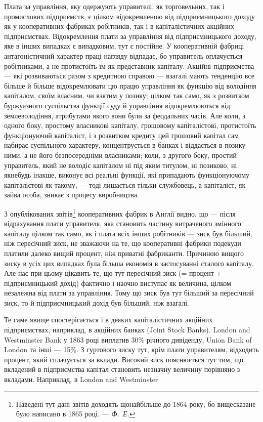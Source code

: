 
Плата за управління, яку одержують управителі, як торговельних,
так і промислових підприємств, є цілком відокремленою від
підприємницького доходу як у кооперативних фабриках робітників,
так і в капіталістичних акційних підприємствах. Відокремлення
плати за управління від підприємницького доходу, яке в інших
випадках є випадковим, тут є постійне. У кооперативній фабриці
антагоністичний характер праці нагляду відпадає, бо управитель
оплачується робітниками, а не протистоїть їм як представник
капіталу. Акційні підприємства — які розвиваються разом
з кредитною справою — взагалі мають тенденцію все більше й
більше відокремлювати цю працю управління як функцію від
володіння капіталом, своїм власним, чи взятим у позику; цілком
так само, як з розвитком буржуазного суспільства функції суду
й управління відокремлюються від землеволодіння, атрибутами
якого вони були за феодальних часів. Але коли, з одного
боку, простому власникові капіталу, грошовому капіталістові,
протистоїть функціонуючий капіталіст, і з розвитком кредиту
цей грошовий капітал сам набирає суспільного характеру, концентрується
в банках і віддається в позику ними, а не його безпосередніми
власниками; коли, з другого боку, простий
управитель, який не володіє капіталом ні під яким титулом,
ні позиково, ні якнебудь інакше, виконує всі реальні функції,
які припадають функціонуючому капіталістові як такому, — тоді
лишається тільки службовець, а капіталіст, як зайва особа,
зникає з процесу виробництва.

З опублікованих звітів\footnote{
Наведені тут дані звітів доходять щонайбільше до 1864 року, бо вищесказане
було написано в 1865 році. — \emph{Ф.~Е.}
} кооперативних фабрик в Англії видно,
що — після відрахування плати управителя, яка становить частину
витраченого змінного капіталу цілком так само, як і плата
всіх інших робітників — зиск був більший, ніж пересічний зиск,
не зважаючи на те, що кооперативні фабрики подекуди платили
далеко вищий процент, ніж приватні фабриканти. Причиною
вищого зиску в усіх цих випадках була більша економія
в застосуванні сталого капіталу. Але нас при цьому цікавить те,
що тут пересічний зиск (= процент + підприємницький дохід)
фактично і наочно виступає як величина, цілком незалежна від
плати за управління. Тому що зиск був тут більший за пересічний
зиск, то й підприємницький дохід був більший, ніж взагалі.

Те саме явище спостерігається і в деяких капіталістичних акційних
підприємствах, наприклад, в акційних банках (Joint Stock
Banks). London and Westminster Bank у 1863 році виплатив 30\%
річного дивіденду, Union Bank of London та інші — 15\%. З гуртового
зиску тут, крім плати управителям, відходить процент,
який сплачується за вклади. Високий зиск пояснюється тут тим,
що вкладений в підприємства капітал становить незначну величину
порівняно з вкладами. Наприклад, в London and Westminster
\parbreak{}  %
